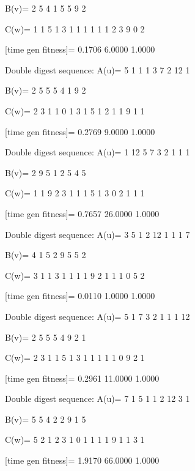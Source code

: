 B(v)=
     2     5     4     1     5     5     9     2

C(w)=
     1     1     5     1     3     1     1     1     1     1     1     2     3     9     0     2

[time gen fitness]=
    0.1706    6.0000    1.0000

Double digest sequence:
A(u)=
     5     1     1     1     3     7     2    12     1

B(v)=
     2     5     5     5     4     1     9     2

C(w)=
     2     3     1     1     0     1     3     1     5     1     2     1     1     9     1     1

[time gen fitness]=
    0.2769    9.0000    1.0000

Double digest sequence:
A(u)=
     1    12     5     7     3     2     1     1     1

B(v)=
     2     9     5     1     2     5     4     5

C(w)=
     1     1     9     2     3     1     1     1     5     1     3     0     2     1     1     1

[time gen fitness]=
    0.7657   26.0000    1.0000

Double digest sequence:
A(u)=
     3     5     1     2    12     1     1     1     7

B(v)=
     4     1     5     2     9     5     5     2

C(w)=
     3     1     1     3     1     1     1     1     9     2     1     1     1     0     5     2

[time gen fitness]=
    0.0110    1.0000    1.0000

Double digest sequence:
A(u)=
     5     1     7     3     2     1     1     1    12

B(v)=
     2     5     5     5     4     9     2     1

C(w)=
     2     3     1     1     5     1     3     1     1     1     1     1     0     9     2     1

[time gen fitness]=
    0.2961   11.0000    1.0000

Double digest sequence:
A(u)=
     7     1     5     1     1     2    12     3     1

B(v)=
     5     5     4     2     2     9     1     5

C(w)=
     5     2     1     2     3     1     0     1     1     1     1     9     1     1     3     1

[time gen fitness]=
    1.9170   66.0000    1.0000

